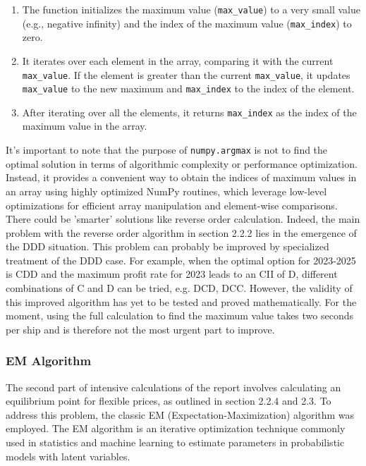 \documentclass[a4paper,12pt]{article}
\begin{document}
\begin{enumerate}
	\item The function initializes the maximum value (\texttt{max\_value}) to a very small value (e.g., negative infinity) and the index of the maximum value (\texttt{max\_index}) to zero.
	\item It iterates over each element in the array, comparing it with the current \texttt{max\_value}. If the element is greater than the current \texttt{max\_value}, it updates \texttt{max\_value} to the new maximum and \texttt{max\_index} to the index of the element.
	\item After iterating over all the elements, it returns \texttt{max\_index} as the index of the maximum value in the array.
\end{enumerate}

It's important to note that the purpose of \texttt{numpy.argmax} is not to find the optimal solution in terms of algorithmic complexity or performance optimization.
Instead, it provides a convenient way to obtain the indices of maximum values in an array using highly optimized NumPy routines, which leverage low-level optimizations for efficient array manipulation and element-wise comparisons.\\



There could be 'smarter' solutions like reverse order calculation.
Indeed, the main problem with the reverse order algorithm in section 2.2.2 lies in the emergence of the DDD situation. This problem can probably be improved by specialized treatment of the DDD case.
For example, when the optimal option for 2023-2025 is CDD and the maximum profit rate for 2023 leads to an CII of D, different combinations of C and D can be tried, e.g. DCD, DCC. However, the validity of this improved algorithm has yet to be tested and proved mathematically.
For the moment, using the full calculation to find the maximum value takes two seconds per ship and is therefore not the most urgent part to improve.\\


\subsubsection{EM Algorithm}

The second part of intensive calculations of the report involves calculating an equilibrium point for flexible prices, as outlined in section 2.2.4 and 2.3.
To address this problem, the classic EM (Expectation-Maximization) algorithm was employed.
The EM algorithm is an iterative optimization technique commonly used in statistics and machine learning to estimate parameters in probabilistic models with latent variables.\\
\end{document}
